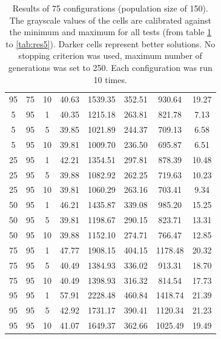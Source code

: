 \begin{table}[H]
\begin{tabular}{ccc|c|c|c|c|c}
95 & 75 & 10 & \cellcolor{gray!42}40.63 & \cellcolor{gray!1}1539.35 & \cellcolor{gray!1}352.51 & \cellcolor{gray!1}930.64 & 19.27\\
5 & 95 & 1 & \cellcolor{gray!45}40.35 & \cellcolor{gray!1}1215.18 & \cellcolor{gray!1}263.81 & \cellcolor{gray!1}821.78 & 7.13\\
5 & 95 & 5 & \cellcolor{gray!50}39.85 & \cellcolor{gray!1}1021.89 & \cellcolor{gray!1}244.37 & \cellcolor{gray!35}709.13 & 6.58\\
5 & 95 & 10 & \cellcolor{gray!50}39.81 & \cellcolor{gray!3}1009.70 & \cellcolor{gray!1}236.50 & \cellcolor{gray!39}695.87 & 6.51\\
25 & 95 & 1 & \cellcolor{gray!26}42.21 & \cellcolor{gray!1}1354.51 & \cellcolor{gray!1}297.81 & \cellcolor{gray!1}878.39 & 10.48\\
25 & 95 & 5 & \cellcolor{gray!50}39.88 & \cellcolor{gray!1}1082.92 & \cellcolor{gray!1}262.25 & \cellcolor{gray!32}719.63 & 10.23\\
25 & 95 & 10 & \cellcolor{gray!50}39.81 & \cellcolor{gray!1}1060.29 & \cellcolor{gray!1}263.16 & \cellcolor{gray!37}703.41 & 9.34\\
50 & 95 & 1 & \cellcolor{gray!1}46.21 & \cellcolor{gray!1}1435.87 & \cellcolor{gray!1}339.08 & \cellcolor{gray!1}985.20 & 15.25\\
50 & 95 & 5 & \cellcolor{gray!50}39.81 & \cellcolor{gray!1}1198.67 & \cellcolor{gray!1}290.15 & \cellcolor{gray!1}823.71 & 13.31\\
50 & 95 & 10 & \cellcolor{gray!50}39.88 & \cellcolor{gray!1}1152.10 & \cellcolor{gray!1}274.71 & \cellcolor{gray!18}766.47 & 12.85\\
75 & 95 & 1 & \cellcolor{gray!1}47.77 & \cellcolor{gray!1}1908.15 & \cellcolor{gray!1}404.15 & \cellcolor{gray!1}1178.48 & 20.32\\
75 & 95 & 5 & \cellcolor{gray!44}40.49 & \cellcolor{gray!1}1384.93 & \cellcolor{gray!1}336.02 & \cellcolor{gray!1}913.31 & 18.70\\
75 & 95 & 10 & \cellcolor{gray!44}40.49 & \cellcolor{gray!1}1398.93 & \cellcolor{gray!1}316.32 & \cellcolor{gray!3}814.54 & 17.73\\
95 & 95 & 1 & \cellcolor{gray!1}57.91 & \cellcolor{gray!1}2228.48 & \cellcolor{gray!1}460.84 & \cellcolor{gray!1}1418.74 & 21.39\\
95 & 95 & 5 & \cellcolor{gray!19}42.92 & \cellcolor{gray!1}1731.17 & \cellcolor{gray!1}390.41 & \cellcolor{gray!1}1120.34 & 21.23\\
95 & 95 & 10 & \cellcolor{gray!38}41.07 & \cellcolor{gray!1}1649.37 & \cellcolor{gray!1}362.66 & \cellcolor{gray!1}1025.49 & 19.49
\end{tabular}
\caption{Results of 75 configurations (population size of 150). The grayscale values of the cells are calibrated against the minimum and maximum for all tests (from table \ref{tab:res1} to \ref{tab:res5}). Darker cells represent better solutions. No stopping criterion was used, maximum number of generations was set to 250. Each configuration was run 10 times.}
\label{tab:res1}
\end{table}

